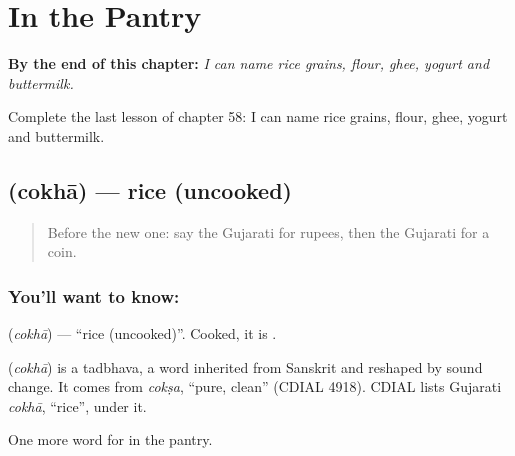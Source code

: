 
\chapter{In the Pantry}
\label{ch:gu-in-the-pantry}

\begin{chapteropening}
\textbf{By the end of this chapter:} \emph{I can name rice grains, flour, ghee, yogurt and buttermilk.}

Complete the last lesson of chapter 58: I can name rice grains, flour, ghee, yogurt and buttermilk.
\end{chapteropening}

\section[\texorpdfstring{\gu{ચોખા} (cokhā)}{ચોખા (cokhā)}]{ (cokhā) — rice (uncooked)}

\label{lesson:GU-C58-rice-grain}



\begin{quote}
Before the new one: say the Gujarati for rupees, then the Gujarati for a coin.
\end{quote}

\subsection*{You'll want to know: }
\textbf{} (\emph{cokhā}) — \textquotedblleft{}rice (uncooked)\textquotedblright{}. Cooked, it is \textbf{}.

\begin{cousinweb}
\textbf{} (\emph{cokhā}) is a tadbhava, a word inherited from Sanskrit and reshaped by sound change. It comes from \emph{cokṣa}, \textquotedblleft{}pure, clean\textquotedblright{} (CDIAL 4918). CDIAL lists Gujarati \emph{cokhā}, \textquotedblleft{}rice\textquotedblright{}, under it.
\end{cousinweb}

\begin{grammarlens}[title={What you've built}]
One more word for in the pantry.
\end{grammarlens}

